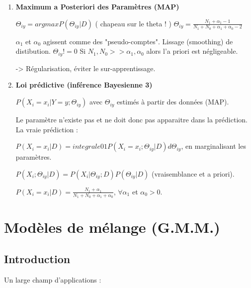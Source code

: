\documentclass{article}
\begin{document}
\begin{enumerate}

\item \textbf{Maximum a Posteriori des Paramètres (MAP)}

$ \Theta_{iy} = argmax P(\Theta_{iy} | D) $ ( chapeau sur le theta ! )
$ \Theta_{iy} = \frac{N_1 + \alpha_1 - 1}{N_1 + N_0 + \alpha_1 + \alpha_0 - 2} $

$\alpha_1$ et $\alpha_0$ agissent comme des "pseudo-comptes". Lissage (smoothing) de distibution.
$\Theta_{iy} != 0$
Si $N_1, N_0 >> \alpha_1, \alpha_0$ alors l'a priori est négligeable.

-> Régularisation, éviter le sur-apprentissage.

\item \textbf{Loi prédictive (inférence Bayesienne 3)}

$P(X_i = x_i | Y = y; \Theta_{iy})$ avec $\Theta_{iy}$ estimés à partir des données (MAP).

Le paramètre n'existe pas et ne doit donc pas apparaitre dans la prédiction. La vraie prédiction :

$P(X_i = x_i | D) = integrale01 P(X_i = x_i; \Theta_{iy} | D) d \Theta_{iy}$, en marginalisant les paramètres.

$P(X_i; \Theta_{iy} | D) = P(X_i | \Theta_{iy}; D) P(\Theta_{iy} | D)$ (vraisemblance et a priori).

$ P(X_i = x_i | D) = \frac{N_1 + \alpha_1}{N_1 + N_0 + \alpha_1 + \alpha_0}$, $\forall \alpha_1$ et $\alpha_0 > 0$.

\end{enumerate}

\section{Modèles de mélange (G.M.M.)}

\subsection{Introduction}

Un large champ d'applications :
\end{document}

